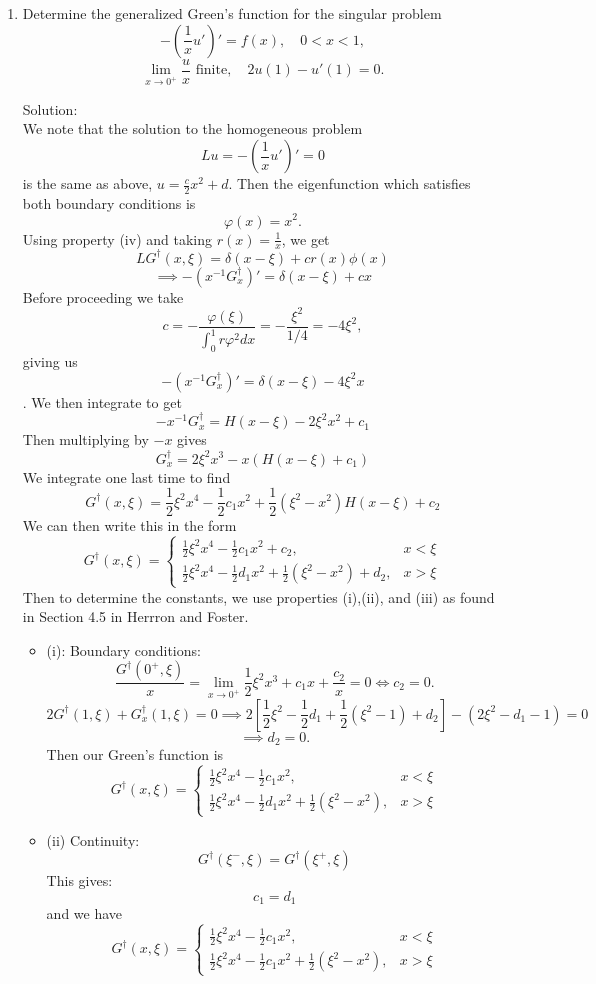 \documentclass[12pt]{article}
\numberwithin{equation}{section}
\begin{document}
\begin{enumerate}
\begin{enumerate}
    \item Determine the generalized Green's function for the singular problem
    $$-(\frac{1}{x}u')'=f(x),\quad 0<x<1,$$
    $$\lim_{x\to 0^+}\frac{u}{x}\text{ finite},\quad 2u(1)-u'(1)=0.$$

    Solution:\\

    We note that the solution to the homogeneous problem
    $$Lu=-(\frac{1}{x}u')'=0$$
    is the same as above, $u=\frac{c}{2}x^2+d$. Then the eigenfunction which satisfies both boundary conditions is
    $$\varphi(x)=x^2.$$
    Using property (iv) and taking $r(x)=\frac{1}{x}$, we get
    $$LG^\dag(x,\xi)=\delta(x-\xi)+cr(x)\phi(x)$$
    $$\implies -(x^{-1}G_x^\dag)'=\delta(x-\xi)+cx$$
    Before proceeding we take
    $$c=-\frac{\varphi(\xi)}{\int_0^1 r\varphi^2dx}=-\frac{\xi^2}{1/4}=-4\xi^2,$$
    giving us
    $$-(x^{-1}G_x^\dag)'=\delta(x-\xi)-4\xi^2 x$$.
    We then integrate to get
    $$-x^{-1}G_x^\dag=H(x-\xi)-2\xi^2x^2+c_1$$
    Then multiplying by $-x$ gives
    $$G_x^\dag=2\xi^2x^3-x(H(x-\xi)+c_1)$$
    We integrate one last time to find
    $$G^\dag(x,\xi)=\frac{1}{2}\xi^2 x^4-\frac{1}{2}c_1x^2+\frac{1}{2}(\xi^2-x^2)H(x-\xi)+c_2$$
    We can then write this in the form
    $$G^\dag(x,\xi)=\left\{\begin{array}{cc}\frac{1}{2}\xi^2x^4-\frac{1}{2}c_1x^2+c_2,&x<\xi\\
                            \frac{1}{2}\xi^2x^4-\frac{1}{2}d_1x^2+\frac{1}{2}(\xi^2-x^2)+d_2,&x>\xi\end{array}\right.$$
    Then to determine the constants, we use properties (i),(ii), and (iii) as found in Section 4.5 in Herrron and Foster.
    \begin{itemize}
    \item (i): Boundary conditions:
    $$\frac{G^\dag(0^+,\xi)}{x}=\lim_{x\to 0^+}\frac{1}{2}\xi^2x^3+c_1x+\frac{c_2}{x}=0 \iff c_2=0.$$
    $$2G^\dag(1,\xi)+G^\dag_x(1,\xi)=0\implies 2[\frac{1}{2}\xi^2-\frac{1}{2}d_1+\frac{1}{2}(\xi^2-1)+d_2]-(2\xi^2-d_1-1)=0$$
    $$\implies d_2=0.$$
    Then our Green's function is
    $$G^\dag(x,\xi)=\left\{\begin{array}{cc}\frac{1}{2}\xi^2x^4-\frac{1}{2}c_1x^2,&x<\xi\\\frac{1}{2}\xi^2x^4-\frac{1}{2}d_1x^2+\frac{1}{2}(\xi^2-x^2),&x>\xi\end{array}\right.$$

    \item (ii) Continuity:
    $$G^\dag(\xi^-,\xi)=G^\dag(\xi^+,\xi)$$
     This gives:
    $$c_1=d_1$$ and we have
    $$G^\dag(x,\xi)=\left\{\begin{array}{cc}\frac{1}{2}\xi^2x^4-\frac{1}{2}c_1x^2,&x<\xi\\\frac{1}{2}\xi^2x^4-\frac{1}{2}c_1x^2+\frac{1}{2}(\xi^2-x^2),&x>\xi\end{array}\right.$$


\end{itemize}
\end{enumerate}
\end{enumerate}
\end{document}
